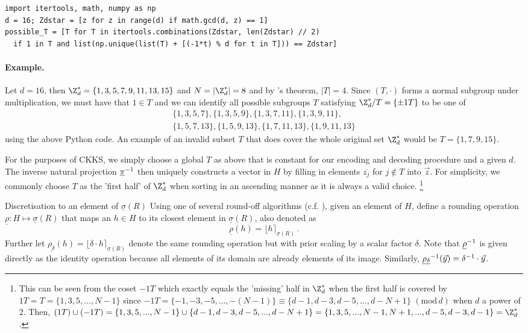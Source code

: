 \begin{verbatim}
import itertools, math, numpy as np
d = 16; Zdstar = [z for z in range(d) if math.gcd(d, z) == 1]
possible_T = [T for T in itertools.combinations(Zdstar, len(Zdstar) // 2)
  if 1 in T and list(np.unique(list(T) + [(-1*t) % d for t in T])) == Zdstar]
\end{verbatim}

\paragraph{Example.}
Let $d = 16$, then $\Z_d^* = \{1, 3, 5, 7, 9, 11, 13, 15\}$ and $N = |\Z_d^*| = 8$ and by 's theorem, $|T| = 4$.
Since $(T, \cdot)$ forms a normal subgroup under multiplication, we must have that $1 \in T$ and we can identify all possible subgroups $T$ satisfying $\Z_d^* / T = \{\pm 1T\}$ to be one of
\begin{align*}
  \{1, 3, 5, 7\},
  \{1, 3, 5, 9\},
  \{1, 3, 7, 11\},
  \{1, 3, 9, 11\}, \\
  \{1, 5, 7, 13\},
  \{1, 5, 9, 13\},
  \{1, 7, 11, 13\},
  \{1, 9, 11, 13\}
\end{align*}
using the above Python code. An example of an invalid subset $T$ that does cover the whole original set $\Z_d^*$ would be $T = \{1, 7, 9, 15\}$.

For the purposes of CKKS, we simply choose a global $T$ as above that is constant for our encoding and decoding procedure and a given $d$.
The inverse natural projection $\underline{\pi}^{-1}$ then uniquely constructs a vector in $H$ by filling in elements $\overline{z_j}$ for $j \notin T$ into $\vec{z}$.
For simplicity, we commonly choose $T$ as the 'first half' of $\Z_d^*$ when sorting in an ascending manner as it is always a valid choice.
\footnote{
  This can be seen from the coset $-1T$ which exactly equals the 'missing' half in $\Z_d^*$ when the first half is covered by $1T = T = \{1, 3, 5, ..., N-1\}$ since $-1T = \{-1, -3, -5, ..., -(N-1)\} \equiv \{d-1, d-3, d-5, ..., d-N+1\}$ $(\text{mod}\, d)$ when $d$ a power of 2.
  Then, $(1T) \cup (-1T) = \{1, 3, 5, ..., N-1\} \cup \{d-1, d-3, d-5, ..., d-N+1\} = \{1, 3, 5, ..., N-1, N+1, ..., d-5, d-3, d-1\} = \Z_d^*$.
}

\begin{definition}{Discretisation to an element of $\underline{\sigma}(R)$}{}
  Using one of several round-off algorithms (c.f. \cite{2013-rlwe-toolkit}), given an element of $H$, define a rounding operation $\underline{\rho}: H \mapsto \underline{\sigma}(R)$ that maps an $h \in H$ to its closest element in $\underline{\sigma}(R)$, also denoted as
  $$\underline{\rho}(h) = \lfloor h \rceil_{\underline{\sigma}(R)}\,.$$
  Further let $\underline{\rho_\delta}(h) = \lfloor \delta \cdot h \rceil_{\underline{\sigma}(R)}$ denote the same rounding operation but with prior scaling by a scalar factor $\delta$.
  Note that $\underline{\rho}^{-1}$ is given directly as the identity operation because all elements of its domain are already elements of its image. Similarly, $\underline{\rho_\delta}^{-1}(\vec{y}) = \delta^{-1} \cdot \vec{y}$.
\end{definition}

